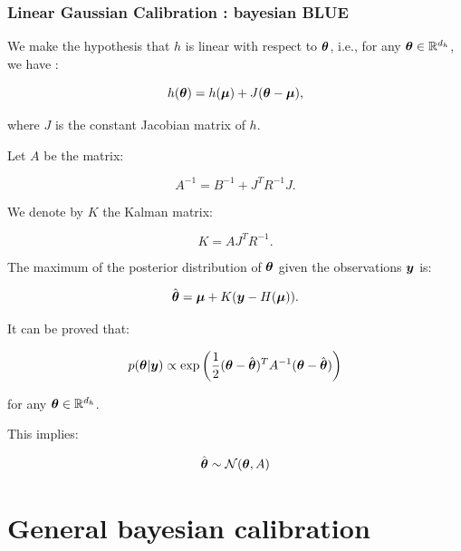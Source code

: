\documentclass{beamer}
\begin{document}
\begin{frame}
\frametitle{Linear Gaussian Calibration : bayesian BLUE}
We make the hypothesis that $h$ is linear with respect to
$\boldsymbol{\theta}$, i.e., for any
$\boldsymbol{\theta}\in\mathbb{R}^{d_h}$, we have :

$$
h(\boldsymbol{\theta}) = h(\boldsymbol{\mu}) + J(\boldsymbol{\theta}-\boldsymbol{\mu} ),
$$

where $J$ is the constant Jacobian matrix of $h$.

Let $A$ be the matrix:

$$
A^{-1} = B^{-1} + J^T R^{-1} J.
$$

We denote by $K$ the Kalman matrix:

$$
K = A J^T R^{-1}.
$$

The maximum of the posterior distribution of $\boldsymbol{\theta}$ given
the observations $\boldsymbol{y}$ is:

$$
\hat{\boldsymbol{\theta}} = \boldsymbol{\mu} + K (\boldsymbol{y} - H(\boldsymbol{\mu})).
$$

\end{frame}

\begin{frame}
It can be proved that:

$$
   p(\boldsymbol{\theta} | \boldsymbol{y}) \propto 
   \exp\left(\frac{1}{2} (\boldsymbol{\theta} - \hat{\boldsymbol{\theta}})^T A^{-1} (\boldsymbol{\theta} - \hat{\boldsymbol{\theta}}) \right)
$$

for any $\boldsymbol{\theta}\in\mathbb{R}^{d_h}$.

This implies:

$$
\hat{\boldsymbol{\theta}} \sim \mathcal{N}(\boldsymbol{\theta},A)
$$
\end{frame}

\section{General bayesian calibration}

\end{document}
